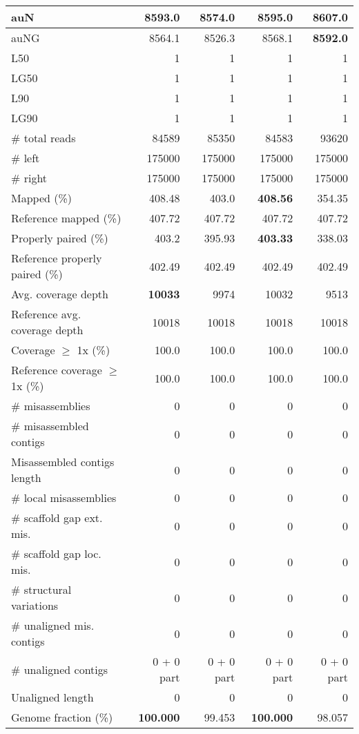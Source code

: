\documentclass[12pt,a4paper]{article}
\begin{document}
\begin{table}[ht]
\begin{center}
\begin{tabular}{|l*{4}{|r}|}
auN & 8593.0 & 8574.0 & 8595.0 & {\bf 8607.0} \\ \hline
auNG & 8564.1 & 8526.3 & 8568.1 & {\bf 8592.0} \\ \hline
L50 & 1 & 1 & 1 & 1 \\ \hline
LG50 & 1 & 1 & 1 & 1 \\ \hline
L90 & 1 & 1 & 1 & 1 \\ \hline
LG90 & 1 & 1 & 1 & 1 \\ \hline
\# total reads & 84589 & 85350 & 84583 & 93620 \\ \hline
\# left & 175000 & 175000 & 175000 & 175000 \\ \hline
\# right & 175000 & 175000 & 175000 & 175000 \\ \hline
Mapped (\%) & 408.48 & 403.0 & {\bf 408.56} & 354.35 \\ \hline
Reference mapped (\%) & 407.72 & 407.72 & 407.72 & 407.72 \\ \hline
Properly paired (\%) & 403.2 & 395.93 & {\bf 403.33} & 338.03 \\ \hline
Reference properly paired (\%) & 402.49 & 402.49 & 402.49 & 402.49 \\ \hline
Avg. coverage depth & {\bf 10033} & 9974 & 10032 & 9513 \\ \hline
Reference avg. coverage depth & 10018 & 10018 & 10018 & 10018 \\ \hline
Coverage $\geq$ 1x (\%) & 100.0 & 100.0 & 100.0 & 100.0 \\ \hline
Reference coverage $\geq$ 1x (\%) & 100.0 & 100.0 & 100.0 & 100.0 \\ \hline
\# misassemblies & 0 & 0 & 0 & 0 \\ \hline
\# misassembled contigs & 0 & 0 & 0 & 0 \\ \hline
Misassembled contigs length & 0 & 0 & 0 & 0 \\ \hline
\# local misassemblies & 0 & 0 & 0 & 0 \\ \hline
\# scaffold gap ext. mis. & 0 & 0 & 0 & 0 \\ \hline
\# scaffold gap loc. mis. & 0 & 0 & 0 & 0 \\ \hline
\# structural variations & 0 & 0 & 0 & 0 \\ \hline
\# unaligned mis. contigs & 0 & 0 & 0 & 0 \\ \hline
\# unaligned contigs & 0 + 0 part & 0 + 0 part & 0 + 0 part & 0 + 0 part \\ \hline
Unaligned length & 0 & 0 & 0 & 0 \\ \hline
Genome fraction (\%) & {\bf 100.000} & 99.453 & {\bf 100.000} & 98.057 \\ \hline

\end{tabular}
\end{center}
\end{table}
\end{document}
